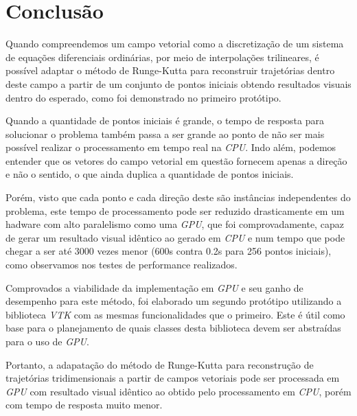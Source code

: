 \chapter{Conclusão}
Quando compreendemos um campo vetorial como a discretização de um sistema de equações diferenciais ordinárias, por meio de interpolações trilineares, é possível adaptar o método de Runge-Kutta para reconstruir trajetórias dentro deste campo a partir de um conjunto de pontos iniciais obtendo resultados visuais dentro do esperado, como foi demonstrado no primeiro protótipo.

Quando a quantidade de pontos iniciais é grande, o tempo de resposta para solucionar o problema também passa a ser grande ao ponto de não ser mais possível realizar o processamento em tempo real na \textit{CPU}. Indo além, podemos entender que os vetores do campo vetorial em questão fornecem apenas a direção e não o sentido, o que ainda duplica a quantidade de pontos iniciais.

Porém, visto que cada ponto e cada direção deste são instâncias independentes do problema, este tempo de processamento pode ser reduzido drasticamente em um hadware com alto paralelismo como uma \textit{GPU}, que foi comprovadamente, capaz de gerar um resultado visual idêntico ao gerado em \textit{CPU} e num tempo que pode chegar a ser até 3000 vezes menor (600s contra 0.2s para 256 pontos iniciais), como observamos nos testes de performance realizados.

Comprovados a viabilidade da implementação em \textit{GPU} e seu ganho de desempenho para este método, foi elaborado um segundo protótipo utilizando a biblioteca \textit{VTK} com as mesmas funcionalidades que o primeiro. Este é útil como base para o planejamento de quais classes desta biblioteca devem ser abstraídas para o uso de \textit{GPU}.

Portanto, a adapatação do método de Runge-Kutta para reconstrução de trajetórias tridimensionais a partir de campos vetoriais pode ser processada em \textit{GPU} com resultado visual idêntico ao obtido pelo processamento em \textit{CPU}, porém com tempo de resposta muito menor.

